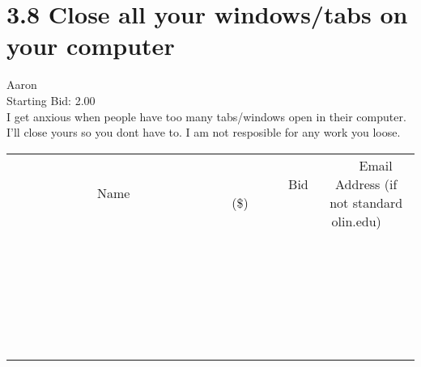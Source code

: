 \documentclass[11pt]{article}
\begin{document}
					\section*{3.8 Close all your windows/tabs on your computer}
					Aaron \\
					Starting Bid: 2.00 \\
					I get anxious when people have too many tabs/windows open in their computer. I'll close yours so you dont have to. I am not resposible for any work you loose. \\
					[6ex]
					\begin{tabular}{c c c}
						~~~~~~~~~~~~~Name~~~~~~~~~~~~~ & ~~~~~~~~~Bid (\$)~~~~~~~~~ & ~~~Email Address (if not standard olin.edu)~~~ \\
				
 & & \\
\hline
 & & \\
\hline
 & & \\
\hline
 & & \\
\hline
 & & \\
\hline
 & & \\
\hline
 & & \\
\hline
 & & \\
\hline
 & & \\
\hline
 & & \\
\hline
 & & \\
\hline
 & & \\
\hline
 & & \\
\hline
 & & \\
\hline
 & & \\
\hline
 & & \\
\hline
 & & \\
\hline
 & & \\
\hline
 & & \\
\hline
 & & \\
\hline
 & & \\
\hline
 & & \\
\hline
 & & \\
\hline
 & & \\
\hline
 & & \\
\hline
 & & \\
\hline
					\end{tabular}
					\clearpage
				
\end{document}
